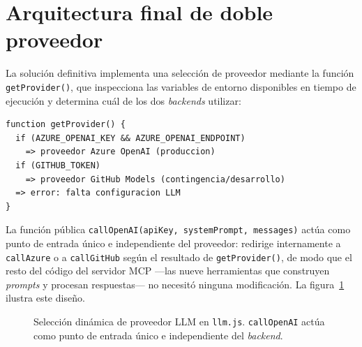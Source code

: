 \section{Arquitectura final de doble proveedor}
\label{sec:anx2-arquitectura}

La solución definitiva implementa una selección de proveedor mediante la función \texttt{getProvider()}, que inspecciona las variables de entorno disponibles en tiempo de ejecución y determina cuál de los dos \textit{backends} utilizar:

\begin{lstlisting}[style=promptbox]
function getProvider() {
  if (AZURE_OPENAI_KEY && AZURE_OPENAI_ENDPOINT)
    => proveedor Azure OpenAI (produccion)
  if (GITHUB_TOKEN)
    => proveedor GitHub Models (contingencia/desarrollo)
  => error: falta configuracion LLM
}
\end{lstlisting}

La función pública \texttt{callOpenAI(apiKey, systemPrompt, messages)} actúa como punto de entrada único e independiente del proveedor: redirige internamente a \texttt{callAzure} o a \texttt{callGitHub} según el resultado de \texttt{getProvider()}, de modo que el resto del código del servidor MCP ---las nueve herramientas que construyen \textit{prompts} y procesan respuestas--- no necesitó ninguna modificación. La figura~\ref{fig:anx2Arquitectura} ilustra este diseño.

\begin{figure}[H]
\centering
{}
\caption{Selección dinámica de proveedor LLM en \texttt{llm.js}. \texttt{callOpenAI} actúa como punto de entrada único e independiente del \textit{backend}.}
\label{fig:anx2Arquitectura}
\end{figure}

